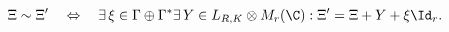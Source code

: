 \begin{equation}
\label{eq:Xiequiv}
  \Xi \sim \Xi' \quad \Leftrightarrow \quad \exists \,\xi \in \Gamma
  \oplus \Gamma^* \exists \, Y \in L_{R,K} \otimes M_r(\C): 
    \Xi' = \Xi + Y + \xi \Id_r.
\end{equation}

